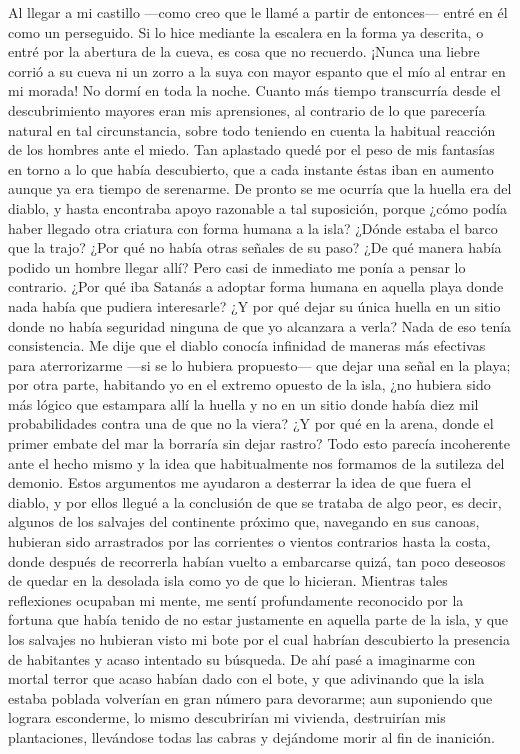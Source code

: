 \documentclass{novela}
\begin{document}
    Al llegar a mi castillo —como creo que le llamé a partir de entonces— entré en él como un perseguido. Si lo hice mediante la escalera en la forma ya descrita, o entré por la abertura de la cueva, es cosa que no recuerdo. ¡Nunca una liebre corrió a su cueva ni un zorro a la suya con mayor espanto que el mío al entrar en mi morada!
    No dormí en toda la noche. Cuanto más tiempo transcurría desde el descubrimiento mayores eran mis aprensiones, al contrario de lo que parecería natural en tal circunstancia, sobre todo teniendo en cuenta la habitual reacción de los hombres ante el miedo. Tan aplastado quedé por el peso de mis fantasías en torno a lo que había descubierto, que a cada instante éstas iban en aumento aunque ya era tiempo de serenarme. De pronto se me ocurría que la huella era del diablo, y hasta encontraba apoyo razonable a tal suposición, porque ¿cómo podía haber llegado otra criatura con forma humana a la isla? ¿Dónde estaba el barco que la trajo? ¿Por qué no había otras señales de su paso? ¿De qué manera había podido un hombre llegar allí? Pero casi de inmediato me ponía a pensar lo contrario. ¿Por qué iba Satanás a adoptar forma humana en aquella playa donde nada había que pudiera interesarle? ¿Y por qué dejar su única huella en un sitio donde no había seguridad ninguna de que yo alcanzara a verla? Nada de eso tenía consistencia. Me dije que el diablo conocía infinidad de maneras más efectivas para aterrorizarme —si se lo hubiera propuesto— que dejar una señal en la playa; por otra parte, habitando yo en el extremo opuesto de la isla, ¿no hubiera sido más lógico que estampara allí la huella y no en un sitio donde había diez mil probabilidades contra una de que no la viera? ¿Y por qué en la arena, donde el primer embate del mar la borraría sin dejar rastro? Todo esto parecía incoherente ante el hecho mismo y la idea que habitualmente nos formamos de la sutileza del demonio.
    Estos argumentos me ayudaron a desterrar la idea de que fuera el diablo, y por ellos llegué a la conclusión de que se trataba de algo peor, es decir, algunos de los salvajes del continente próximo que, navegando en sus canoas, hubieran sido arrastrados por las corrientes o vientos contrarios hasta la costa, donde después de recorrerla habían vuelto a embarcarse quizá, tan poco deseosos de quedar en la desolada isla como yo de que lo hicieran.
    Mientras tales reflexiones ocupaban mi mente, me sentí profundamente reconocido por la fortuna que había tenido de no estar justamente en aquella parte de la isla, y que los salvajes no hubieran visto mi bote por el cual habrían descubierto la presencia de habitantes y acaso intentado su búsqueda. De ahí pasé a imaginarme con mortal terror que acaso habían dado con el bote, y que adivinando que la isla estaba poblada volverían en gran número para devorarme; aun suponiendo que lograra esconderme, lo mismo descubrirían mi vivienda, destruirían mis plantaciones, llevándose todas las cabras y dejándome morir al fin de inanición.
\end{document}
